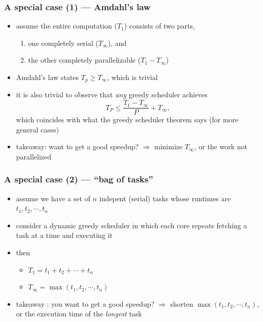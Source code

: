 \documentclass[12pt,dvipdfmx]{beamer}
\newcommand{\ao}[1]{{\color{blue}#1}}
\begin{document}
\begin{frame}
  \frametitle{A special case (1) --- Amdahl's law}
  \begin{itemize}
  \item assume the entire computation ($T_1$)
    consists of two parts,
    \begin{enumerate}
    \item one completely serial
      ($T_\infty$), and
    \item the other completely parallelizable
      ($T_1 - T_\infty$)
    \end{enumerate}
  \begin{center}
    \def\svgwidth{0.7\columnwidth}
    {\scriptsize}
  \end{center}
  \item Amdahl's law states $T_p \geq T_\infty$, which is trivial
  \item it is also trivial to observe that {\it any} greedy scheduler achieves
    \[ T_P \leq \frac{T_1 - T_\infty}{P} + T_\infty, \]
    which coincides with what the greedy scheduler theorem says
    (for more general cases)
  \item takeaway: want to get a good speedup? $\Rightarrow$ minimize $T_\infty$, or the work not parallelized
  \end{itemize}
\end{frame}

\begin{frame}
  \frametitle{A special case (2) --- ``bag of tasks''}
  \begin{itemize}
  \item assume we have a set of $n$ indepent (serial) tasks whose runtimes are
    $t_1, t_2, \cdots , t_n$

    \begin{center}
      \def\svgwidth{0.5\columnwidth}
        
\end{center}

  \item consider a dynamic greedy scheduler in which each core repeats
    fetching a task at a time and executing it
  \item then
    \begin{itemize}
    \item $T_1 = t_1 + t_2 + \cdots + t_n$
    \item $T_\infty = \max(t_1, t_2, \cdots , t_n)$
    \end{itemize}
  \item takeaway : you want to get a good speedup? $\Rightarrow$ shorten
    $\max(t_1, t_2, \cdots , t_n)$,
    or the execution time of the \ao{\it longest} task
  \end{itemize}

\end{frame}
\end{document}
